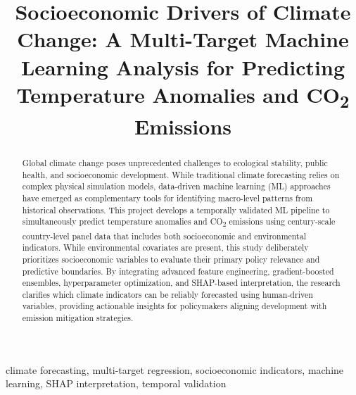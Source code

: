 \documentclass[conference]{IEEEtran}
\begin{document}
\title{Socioeconomic Drivers of Climate Change: A Multi-Target Machine
Learning Analysis for Predicting Temperature Anomalies and CO\textsubscript{2}
Emissions}

\author{
    \and
}

\maketitle

\begin{abstract}
Global climate change poses unprecedented challenges to ecological
stability, public health, and socioeconomic development. While traditional
climate forecasting relies on complex physical simulation models, data-driven
machine learning (ML) approaches have emerged as complementary tools for
identifying macro-level patterns from historical observations. This project
develops a temporally validated ML pipeline to simultaneously predict
temperature anomalies and CO\textsubscript{2} emissions using century-scale
country-level panel data that includes both socioeconomic and environmental
indicators. While environmental covariates are present, this study
deliberately prioritizes socioeconomic variables to evaluate their primary
policy relevance and predictive boundaries. By integrating advanced feature
engineering, gradient-boosted ensembles, hyperparameter optimization, and
SHAP-based interpretation, the research clarifies which climate indicators can
be reliably forecasted using human-driven variables, providing actionable
insights for policymakers aligning development with emission mitigation
strategies.
\end{abstract}

\begin{IEEEkeywords}
climate forecasting, multi-target regression, socioeconomic indicators,
machine learning, SHAP interpretation, temporal validation
\end{IEEEkeywords}
\end{document}

